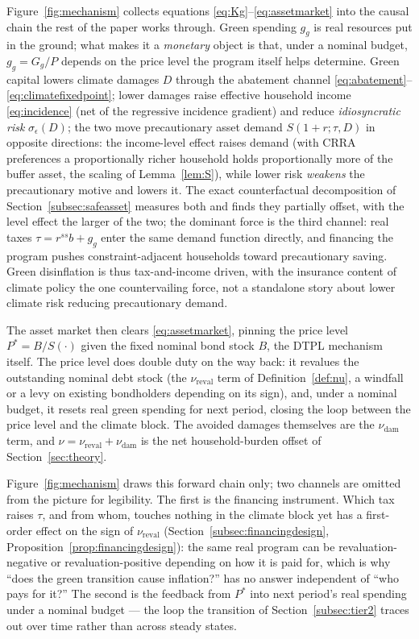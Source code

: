 \documentclass[12pt]{article}
\newcommand{\Sfun}{S}
\begin{document}
Figure~\ref{fig:mechanism} collects equations \eqref{eq:Kg}--\eqref{eq:assetmarket}
into the causal chain the rest of the paper works through. Green spending
$g_g$ is real resources put in the ground; what makes it a \emph{monetary}
object is that, under a nominal budget, $g_g = G_g/P$ depends on the price
level the program itself helps determine. Green capital lowers climate
damages $D$ through the abatement channel \eqref{eq:abatement}--\eqref{eq:climatefixedpoint};
lower damages raise effective household income
\eqref{eq:incidence} (net of the regressive incidence gradient) and reduce
\emph{idiosyncratic risk} $\sigma_\epsilon(D)$; the two move
precautionary asset demand $\Sfun(1+r;\tau,D)$ in opposite
directions: the income-level effect raises demand (with CRRA
preferences a proportionally richer household holds proportionally more
of the buffer asset, the scaling of Lemma~\ref{lem:S}), while lower
risk \emph{weakens} the precautionary motive and lowers it. The exact
counterfactual decomposition of Section~\ref{subsec:safeasset} measures
both and finds they partially offset, with the level effect the larger of
the two; the dominant force is the third channel: real taxes
$\tau = r^{ss}b + g_g$ enter the same demand function directly, and
financing the program pushes constraint-adjacent households toward
precautionary saving. Green disinflation is thus tax-and-income driven,
with the insurance content of climate policy the one countervailing
force, not a standalone story about lower climate risk reducing
precautionary demand.

The asset market then clears
\eqref{eq:assetmarket}, pinning the price level $P^{*}=B/\Sfun(\cdot)$
given the fixed nominal bond stock $B$, the DTPL mechanism itself.
The price level does double duty on the way back: it revalues the
outstanding nominal debt stock (the $\nu_{\mathrm{reval}}$ term of
Definition~\ref{def:nu}, a windfall or a levy on existing bondholders
depending on its sign), and, under a nominal budget, it resets real green
spending for next period, closing the loop between the price level and
the climate block. The avoided damages themselves are the
$\nu_{\mathrm{dam}}$ term, and $\nu=\nu_{\mathrm{reval}}+\nu_{\mathrm{dam}}$
is the net household-burden offset of Section~\ref{sec:theory}.

Figure~\ref{fig:mechanism} draws this forward chain only; two channels are
omitted from the picture for legibility. The first is the financing
instrument. Which tax raises $\tau$, and from whom, touches nothing in the
climate block yet has a first-order effect on the sign of
$\nu_{\mathrm{reval}}$ (Section~\ref{subsec:financingdesign},
Proposition~\ref{prop:financingdesign}): the same real program can be
revaluation-negative or revaluation-positive depending on how it is paid
for, which is why ``does the green transition cause inflation?'' has no
answer independent of ``who pays for it?'' The second is the feedback from
$P^{*}$ into next period's real spending under a nominal budget --- the loop
the transition of Section~\ref{subsec:tier2} traces out over time rather
than across steady states.
\end{document}
